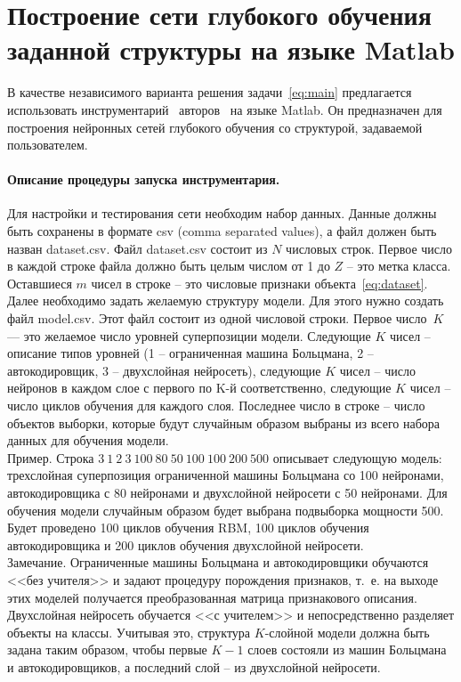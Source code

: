 \documentclass[12pt]{article}
\begin{document}
\section{Построение сети глубокого обучения заданной структуры на языке Matlab}
В качестве независимого варианта решения задачи~\eqref{eq:main} предлагается использовать инструментарий~\cite{source_popova} авторов~\cite{ts3} на языке Matlab. Он предназначен для построения нейронных сетей глубокого обучения со структурой, задаваемой пользователем.
\paragraph{Описание процедуры запуска инструментария.} Для настройки и тестирования сети необходим набор данных. Данные должны быть сохранены в формате csv (comma separated values), а файл должен быть назван dataset.csv. Файл dataset.csv состоит из $N$ числовых строк. Первое число в каждой строке файла должно быть целым числом от 1 до $Z$ -- это метка класса. Оставшиеся $m$ чисел в строке -- это числовые признаки объекта~\eqref{eq:dataset}. Далее необходимо задать желаемую структуру модели. Для этого нужно создать файл model.csv. Этот файл состоит из одной числовой строки. Первое число~$K$ --- это желаемое число уровней суперпозиции модели. Следующие $K$ чисел -- описание типов уровней (1 -- ограниченная машина Больцмана, 2 -- автокодировщик, 3 -- двухслойная нейросеть), следующие $K$ чисел -- число нейронов в каждом слое с первого по K-й соответственно, следующие $K$ чисел -- число циклов обучения для каждого слоя. Последнее число в строке -- число объектов выборки, которые будут случайным образом выбраны из всего набора данных для обучения модели. \\

Пример. Строка $3~1~2~3~100~80~50~100~100~200~500$ описывает следующую модель: трехслойная суперпозиция ограниченной машины Больцмана со 100 нейронами, автокодировщика с 80 нейронами и двухслойной нейросети с 50 нейронами. Для обучения модели случайным образом будет выбрана подвыборка мощности 500. Будет проведено 100 циклов обучения RBM, 100 циклов обучения автокодировщика и 200 циклов обучения двухслойной нейросети.\\

Замечание. Ограниченные машины Больцмана и автокодировщики обучаются <<без учителя>> и задают процедуру порождения признаков, т.~е. на выходе этих моделей получается преобразованная матрица признакового описания. Двухслойная нейросеть обучается <<с учителем>> и непосредственно разделяет объекты на классы. Учитывая это, структура $K$-слойной модели должна быть задана таким образом, чтобы первые $K-1$ слоев состояли из машин Больцмана и автокодировщиков, а последний слой -- из двухслойной нейросети.
\end{document}
